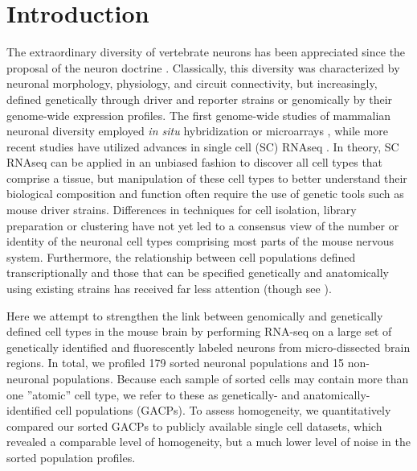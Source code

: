 \section*{Introduction}

The extraordinary diversity of vertebrate neurons has been appreciated since the proposal of the neuron doctrine \citep{Cajal_1888}. Classically, this diversity was characterized by neuronal morphology, physiology, and circuit connectivity, but increasingly, defined genetically through driver and reporter strains \citep{Gong_2003, Madisen_2009, Taniguchi_2011, Shima_2016} or genomically by their genome-wide expression profiles. The first genome-wide studies of mammalian neuronal diversity employed \textit{in situ} hybridization \citep{Lein_2006} or microarrays \citep{Sugino_2005, Doyle_2008}, while more recent studies have utilized advances in single cell (SC) RNAseq \citep{Zeisel_2015, Zeisel_2018, Tasic_2016, Tasic_2018, Paul_2017}. In theory, SC RNAseq can be applied in an unbiased fashion to discover all cell types that comprise a tissue, but manipulation of these cell types to better understand their biological composition and function often require the use of genetic tools such as mouse driver strains. Differences in techniques for cell isolation, library preparation or clustering have not yet led to a consensus view of the number or identity of the neuronal cell types comprising most parts of the mouse nervous system. Furthermore, the relationship between cell populations defined transcriptionally and those that can be specified genetically and anatomically using existing strains has received far less attention (though see \citealt{Tasic_2018}).    
 
Here we attempt to strengthen the link between genomically and genetically defined cell types in the mouse brain by performing RNA-seq on a large set of genetically identified and fluorescently labeled neurons from micro-dissected brain regions. In total, we profiled 179 sorted neuronal populations and 15 non-neuronal populations. Because each sample of sorted cells may contain more than one ”atomic” cell type, we refer to these as genetically- and anatomically-identified cell populations (GACPs). To assess homogeneity, we quantitatively compared our sorted GACPs to publicly available single cell datasets, which revealed a comparable level of homogeneity, but a much lower level of noise in the sorted population profiles.

